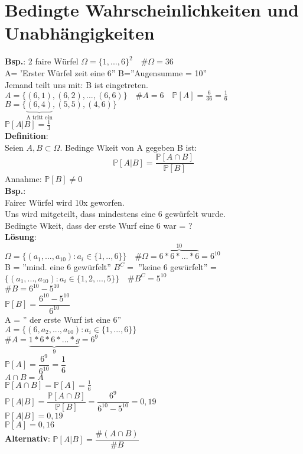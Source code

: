 \chapter{Bedingte Wahrscheinlichkeiten und Unabhängigkeiten}
\textbf{Bsp.}: 2 faire Würfel \hspace{1cm} $\Omega = \{1,...,6\}^2 \quad \#\Omega=36$\\
A= 'Erster Würfel zeit eine 6''\hspace{1cm} B=''Augensumme = 10''\smallskip\\
Jemand teilt uns mit: B ist eingetreten.\smallskip\\
$A=\{(6,1),(6,2),...,(6,6)\} \quad \#A =6 \quad \mathds{P}[A] = \frac{6}{36}= \frac{1}{6}$
$B=\{\underbrace{(6,4)}_\text{A tritt ein},(5,5),(4,6)\}$\medskip\\
$\mathds{P}[A|B]= \frac{1}{3}$\medskip\\
\textbf{Definition}:\\
Seien $A,B \subset \Omega$. Bedinge Wkeit von A gegeben B ist: $$\mathds{P}[A|B] = \dfrac{\mathds{P}[A \cap B]}{\mathds{P}[B]}$$
Annahme: $\mathds{P}[B] \neq 0$\medskip\\
\textbf{Bsp.}:\\ Fairer Würfel wird 10x geworfen.\\
Uns wird mitgeteilt, dass mindestens eine 6 gewürfelt wurde.\smallskip\\
Bedingte Wkeit, dass der erste Wurf eine 6 war = ?\medskip\\
\textbf{Lösung}:\\
$\Omega = \{(a_1,...,a_{10}):a_i \in \{1,..,6\}\} \quad \#\Omega = \overbrace{6*6*...*6}^{10} = 6^{10}$\\
B = ''mind. eine 6 gewürfelt'' \hspace{1cm} $B^C =$ ''keine 6 gewürfelt'' =\\
$\{(a_1,...,a_10):a_i \in \{1,2,...,5\}\} \quad \#B^C = 5^{10}$\smallskip\\
$\#B = 6^{10}-5^{10}$\\
$\mathds{P}[B] = \dfrac{6^{10}-5^{10}}{6^{10}}$\smallskip\\
A = '' der erste Wurf ist eine 6''\\
$A = \{(6,a_2,...,a_10):a_i \in \{1,...,6\}\}$\\
$\#A = \underbrace{1*6*6*...*g}_9 = 6^9	$\smallskip\\
$\mathds{P}[A] = \dfrac{6^9}{6^{10}}= \dfrac{1}{6}$\medskip\\
$A\cap B = A$\\
$\mathds{P}[A\cap B] = \mathds{P}[A]=\frac{1}{6}$\smallskip\\
$\mathds{P}[A  \vert B ] = \dfrac{\mathds{P}[A \cap B]}{\mathds{P}[B]} = \dfrac{6^9}{6^{10}-5^{10}} = 0,19$\medskip\\
$\mathds{P}[A\vert B] = 0,19$\\
$\mathds{P}[A] = 0,16$\medskip\\
\textbf{Alternativ}: $\mathds{P}[A\vert B] = \dfrac{\#(A\cap B)}{\#B}$

